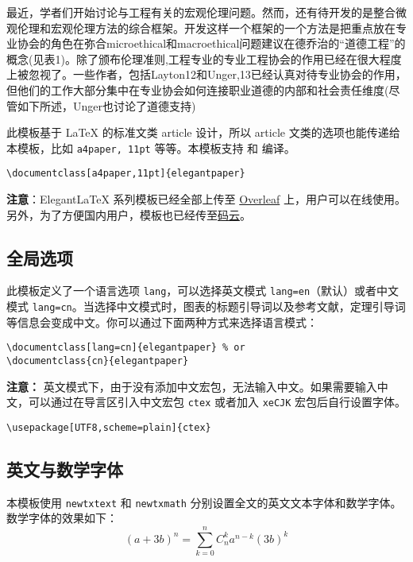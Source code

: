 \documentclass[lang=cn,11pt,a4paper]{elegantpaper}
\begin{document}
最近，学者们开始讨论与工程有关的宏观伦理问题。然而，还有待开发的是整合微观伦理和宏观伦理方法的综合框架。开发这样一个框架的一个方法是把重点放在专业协会的角色在弥合microethical和macroethical问题建议在德乔治的“道德工程”的概念(见表1)。除了颁布伦理准则,工程专业的专业工程协会的作用已经在很大程度上被忽视了。一些作者，包括Layton12和Unger,13已经认真对待专业协会的作用，但他们的工作大部分集中在专业协会如何连接职业道德的内部和社会责任维度(尽管如下所述，Unger也讨论了道德支持)

此模板基于 \LaTeX{} 的标准文类 article 设计，所以 article 文类的选项也能传递给本模板，比如 \lstinline{a4paper, 11pt} 等等。本模板支持  和  编译。

\begin{lstlisting}
\documentclass[a4paper,11pt]{elegantpaper}
\end{lstlisting}

\textbf{注意}：Elegant\LaTeX{} 系列模板已经全部上传至 \href{https://www.overleaf.com/latex/templates/elegantpaper-template/yzghrqjhmmmr}{Overleaf} 上，用户可以在线使用。另外，为了方便国内用户，模板也已经传至\href{https://gitee.com/ElegantLaTeX/ElegantPaper}{码云}。


\subsection{全局选项}
此模板定义了一个语言选项 \lstinline{lang}，可以选择英文模式 \lstinline{lang=en}（默认）或者中文模式 \lstinline{lang=cn}。当选择中文模式时，图表的标题引导词以及参考文献，定理引导词等信息会变成中文。你可以通过下面两种方式来选择语言模式：
\begin{lstlisting}
\documentclass[lang=cn]{elegantpaper} % or
\documentclass{cn}{elegantpaper} 
\end{lstlisting}

\textbf{注意：} 英文模式下，由于没有添加中文宏包，无法输入中文。如果需要输入中文，可以通过在导言区引入中文宏包 \lstinline{ctex} 或者加入 \lstinline{xeCJK} 宏包后自行设置字体。 
\begin{lstlisting}
\usepackage[UTF8,scheme=plain]{ctex}
\end{lstlisting}

\subsection{英文与数学字体}

本模板使用 \lstinline{newtxtext} 和 \lstinline{newtxmath} 分别设置全文的英文文本字体和数学字体。数学字体的效果如下：
\begin{equation}
(a+3b)^{n} = \sum_{k=0}^{n} C_{n}^{k} a^{n-k} (3b)^k\label{eq:binom}
\end{equation}
\end{document}
